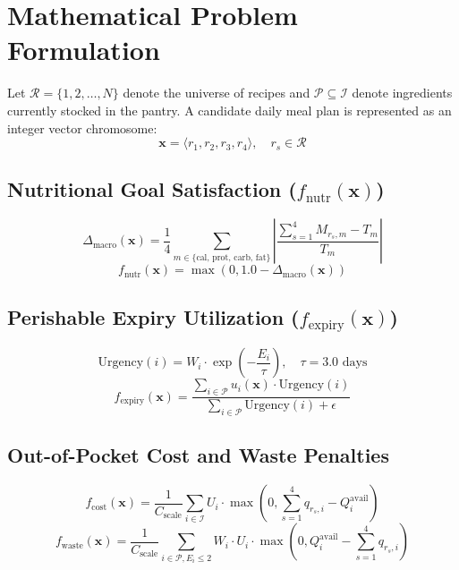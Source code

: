 ﻿\documentclass[conference]{IEEEtran}
\begin{document}
\section{Mathematical Problem Formulation}
Let $\mathcal{R} = \{1, 2, \dots, N\}$ denote the universe of recipes and $\mathcal{P} \subseteq \mathcal{I}$ denote ingredients currently stocked in the pantry. A candidate daily meal plan is represented as an integer vector chromosome:
\begin{equation}
\mathbf{x} = \langle r_1, r_2, r_3, r_4 \rangle, \quad r_s \in \mathcal{R}
\end{equation}

\subsection{Nutritional Goal Satisfaction ($f_{\text{nutr}}(\mathbf{x})$)}
\begin{equation}
\Delta_{\text{macro}}(\mathbf{x}) = \frac{1}{4}\sum_{m \in \{\text{cal, prot, carb, fat}\}} \left| \frac{\sum_{s=1}^4 M_{r_s, m} - T_m}{T_m} \right|
\end{equation}
\begin{equation}
f_{\text{nutr}}(\mathbf{x}) = \max(0, 1.0 - \Delta_{\text{macro}}(\mathbf{x}))
\end{equation}

\subsection{Perishable Expiry Utilization ($f_{\text{expiry}}(\mathbf{x})$)}
\begin{equation}
\text{Urgency}(i) = W_i \cdot \exp\left(-\frac{E_i}{\tau}\right), \quad \tau = 3.0 \text{ days}
\end{equation}
\begin{equation}
f_{\text{expiry}}(\mathbf{x}) = \frac{\sum_{i \in \mathcal{P}} u_i(\mathbf{x}) \cdot \text{Urgency}(i)}{\sum_{i \in \mathcal{P}} \text{Urgency}(i) + \epsilon}
\end{equation}

\subsection{Out-of-Pocket Cost and Waste Penalties}
\begin{equation}
f_{\text{cost}}(\mathbf{x}) = \frac{1}{C_{\text{scale}}} \sum_{i \in \mathcal{I}} U_i \cdot \max\left(0, \sum_{s=1}^4 q_{r_s, i} - Q_i^{\text{avail}}\right)
\end{equation}
\begin{equation}
f_{\text{waste}}(\mathbf{x}) = \frac{1}{C_{\text{scale}}} \sum_{i \in \mathcal{P}, E_i \le 2} W_i \cdot U_i \cdot \max\left(0, Q_i^{\text{avail}} - \sum_{s=1}^4 q_{r_s, i}\right)
\end{equation}
\end{document}
